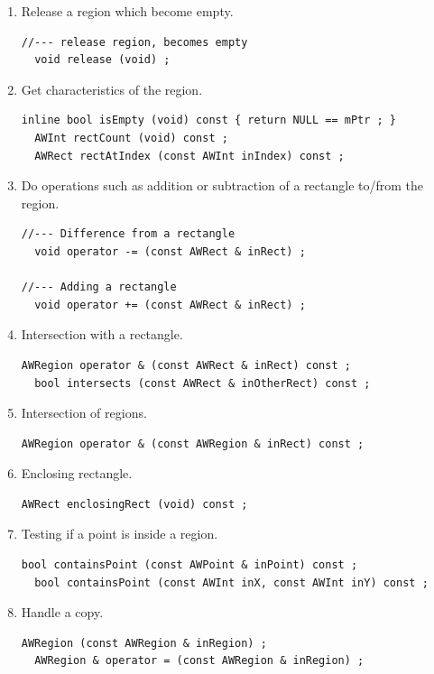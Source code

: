 \documentclass[a4paper,11pt]{extarticle}
\begin{document}
\begin{enumerate}
\item Release a region which become empty.
\begin{lstlisting}[language=Arduinonl]
//--- release region, becomes empty
  void release (void) ;
\end{lstlisting}

\item Get characteristics of the region.
\begin{lstlisting}[language=Arduinonl]
  inline bool isEmpty (void) const { return NULL == mPtr ; }
  AWInt rectCount (void) const ;
  AWRect rectAtIndex (const AWInt inIndex) const ;
\end{lstlisting}

\item Do operations such as addition or subtraction of a rectangle to/from the region.
\begin{lstlisting}[language=Arduinonl]
//--- Difference from a rectangle
  void operator -= (const AWRect & inRect) ;

//--- Adding a rectangle
  void operator += (const AWRect & inRect) ;
\end{lstlisting}

\item Intersection with a rectangle.
\begin{lstlisting}[language=Arduinonl]
  AWRegion operator & (const AWRect & inRect) const ;
  bool intersects (const AWRect & inOtherRect) const ;
\end{lstlisting}

\item Intersection of regions.
\begin{lstlisting}[language=Arduinonl]
  AWRegion operator & (const AWRegion & inRect) const ;
\end{lstlisting}

\item Enclosing rectangle.
\begin{lstlisting}[language=Arduinonl]
  AWRect enclosingRect (void) const ;
\end{lstlisting}

\item Testing if a point is inside a region.
\begin{lstlisting}[language=Arduinonl]
  bool containsPoint (const AWPoint & inPoint) const ;
  bool containsPoint (const AWInt inX, const AWInt inY) const ;
\end{lstlisting}

\item Handle a copy.
\begin{lstlisting}[language=Arduinonl]
  AWRegion (const AWRegion & inRegion) ;
  AWRegion & operator = (const AWRegion & inRegion) ;
\end{lstlisting}

\end{enumerate}
\end{document}

